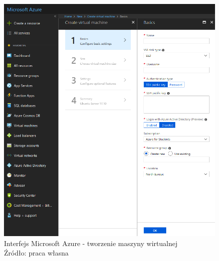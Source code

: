 \begin{figure}[h!tb]
	 \centering
	 \includegraphics[width = 1.0\linewidth]{img/azure}
	 \caption{Interfejs Microsoft Azure - tworzenie maszyny wirtualnej \\
              Źródło: praca własna}
	 \label{fig:azure}
\end{figure}

